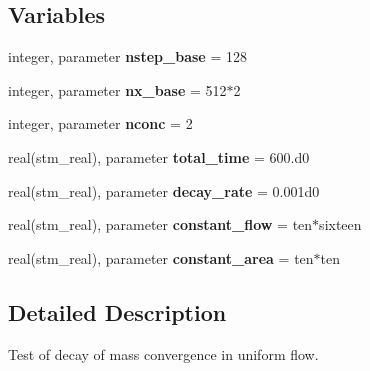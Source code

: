 \subsection*{Variables}
\begin{CompactItemize}
\item 
\hypertarget{a00088_13b91142e733341feb0e2db8e16dec50}{
integer, parameter \textbf{nstep\_\-base} = 128}
\label{a00088_13b91142e733341feb0e2db8e16dec50}

\item 
\hypertarget{a00088_13db73f3f2cc3ae753c29f560b4cfdeb}{
integer, parameter \textbf{nx\_\-base} = 512$\ast$2}
\label{a00088_13db73f3f2cc3ae753c29f560b4cfdeb}

\item 
\hypertarget{a00088_39ff6be4b19f3b668f9c38e356f204e1}{
integer, parameter \textbf{nconc} = 2}
\label{a00088_39ff6be4b19f3b668f9c38e356f204e1}

\item 
\hypertarget{a00088_38f105861282e75079ccfe1ac4153945}{
real(stm\_\-real), parameter \textbf{total\_\-time} = 600.d0}
\label{a00088_38f105861282e75079ccfe1ac4153945}

\item 
\hypertarget{a00088_57c825b4315d592db3911e6fd51884ce}{
real(stm\_\-real), parameter \textbf{decay\_\-rate} = 0.001d0}
\label{a00088_57c825b4315d592db3911e6fd51884ce}

\item 
\hypertarget{a00088_cb07b8c5f5b28bca0c0ee21dffe4b33f}{
real(stm\_\-real), parameter \textbf{constant\_\-flow} = ten$\ast$sixteen}
\label{a00088_cb07b8c5f5b28bca0c0ee21dffe4b33f}

\item 
\hypertarget{a00088_e49c44fdf9b4d1658db850ecf4b1005a}{
real(stm\_\-real), parameter \textbf{constant\_\-area} = ten$\ast$ten}
\label{a00088_e49c44fdf9b4d1658db850ecf4b1005a}

\end{CompactItemize}


\subsection{Detailed Description}
Test of decay of mass convergence in uniform flow. 



